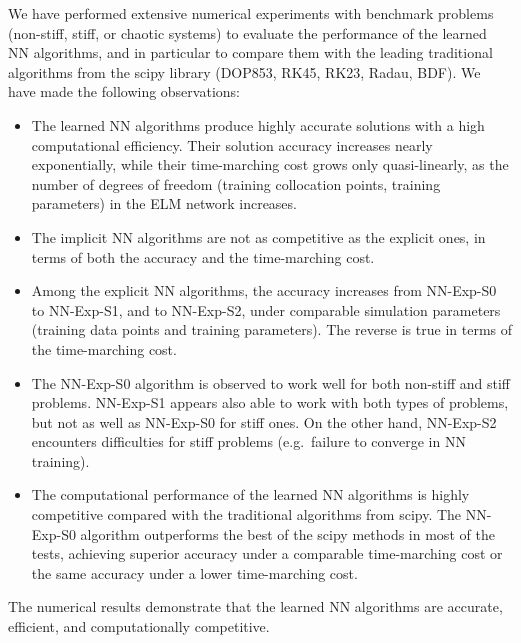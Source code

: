 
We have performed extensive numerical experiments with  benchmark problems
(non-stiff, stiff, or chaotic systems) to
evaluate the performance of the learned NN algorithms, and in particular
to compare them with the leading traditional algorithms
from the scipy library (DOP853, RK45, RK23, Radau, BDF).
We have made the following observations:
\begin{itemize}

\item
  The learned NN  algorithms produce highly accurate
  solutions with a high computational efficiency.
  Their solution accuracy  increases nearly exponentially,
  while their time-marching cost
  grows only quasi-linearly, as the
  number of degrees of freedom
  (training collocation points,  training parameters)
  in the ELM network increases.

\item
  The implicit NN algorithms are not as competitive as the explicit ones,
  in terms of both the accuracy and the time-marching cost.

\item
  Among the explicit NN algorithms, the accuracy increases from NN-Exp-S0
  to NN-Exp-S1, and to NN-Exp-S2, under comparable simulation
  parameters (training data points and training parameters).
  The reverse is true in terms of the time-marching cost.

\item
  The NN-Exp-S0 algorithm is observed to work well for both non-stiff and stiff
  problems. NN-Exp-S1 appears also able to work with both types of problems, but
  not as well as NN-Exp-S0 for stiff ones. On the other hand,  NN-Exp-S2 encounters
  difficulties for stiff problems (e.g.~failure to converge in NN training).

\item
  The computational performance of the learned NN algorithms is highly competitive
  compared with the traditional algorithms from scipy. The NN-Exp-S0 algorithm
  outperforms the best of the scipy methods in most of the tests,
  achieving superior accuracy under a comparable time-marching cost or the same
  accuracy under a lower time-marching cost.

\end{itemize}
The numerical results demonstrate that the learned NN  algorithms are
accurate, efficient, and computationally competitive.


